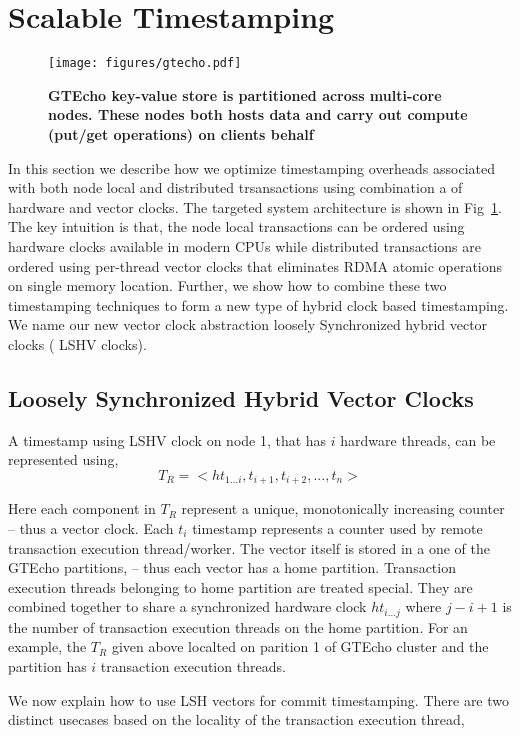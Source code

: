 \section{Scalable Timestamping}
\begin{figure}[]   
	\centering
	\texttt{[image: figures/gtecho.pdf]} 
	\caption{\bf GTEcho key-value store is partitioned across multi-core nodes. These nodes
	both hosts data and carry out compute (put/get operations) on clients behalf} 
	\label{fig:gtecho} 
\end{figure}

In this section we describe how we optimize timestamping overheads
associated with both node local and distributed trsansactions using combination
a of hardware and vector clocks. The targeted system architecture is shown in Fig~\ref{fig:gtecho}.
The key intuition is that, the node local transactions
can be ordered using hardware clocks available in modern CPUs while distributed 
transactions are ordered using per-thread vector clocks that eliminates RDMA atomic operations
on single memory location. Further, we show how to combine these
two timestamping techniques to form a new type of hybrid clock based timestamping. 
We name our new vector clock abstraction loosely Synchronized hybrid vector clocks ( LSHV clocks).

\subsection{Loosely Synchronized Hybrid Vector Clocks}

A timestamp using LSHV clock on node 1, that has $i$ hardware threads, can be represented using,
\[T_R = <ht_{1...i},t_{i+1}, t_{i+2}, ..., t_n>\]

Here each component in $T_R$ represent a unique, monotonically increasing counter -- thus a vector
clock. Each $t_i$ timestamp represents a counter used by remote transaction execution thread/worker.
The vector itself is stored in a one of the GTEcho partitions, -- thus each vector has a home partition.
Transaction execution threads belonging to home partition are treated special. They are combined together
to share a synchronized hardware clock $ht_{i...j}$ where $j - i + 1$ is the number of transaction execution
threads on the home partition. For an example, the $T_R$ given above localted on parition 1 of GTEcho
cluster and the partition has $i$ transaction execution threads.

We now explain how to use LSH vectors for commit timestamping. There are two distinct usecases based on the
locality of the transaction execution thread,

